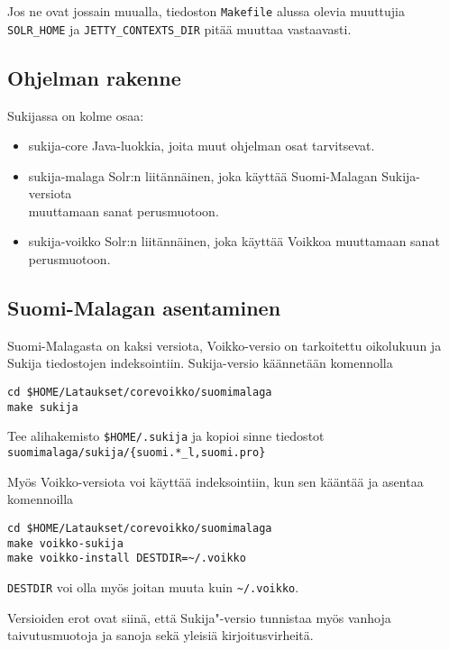 \documentclass[12pt,a4paper]{scrartcl}
\begin{document}
Jos ne ovat jossain muualla, tiedoston \verb=Makefile= alussa olevia
muuttujia \verb=SOLR_HOME= ja \verb=JETTY_CONTEXTS_DIR= pitää muuttaa
vastaavasti.

\newpage
\subsection*{Ohjelman rakenne}

Sukijassa on kolme osaa:

\begin{itemize}
\item sukija-core     Java-luokkia, joita muut ohjelman osat tarvitsevat.
\item sukija-malaga   Solr:n liitännäinen, joka käyttää Suomi-Malagan
                      Sukija-versiota \\muuttamaan sanat perusmuotoon.
\item sukija-voikko   Solr:n liitännäinen, joka käyttää Voikkoa
                      muuttamaan sanat perusmuotoon.
\end{itemize}


\subsection*{Suomi-Malagan asentaminen}

Suomi-Malagasta on kaksi versiota, Voikko-versio on tarkoitettu
oikolukuun ja Sukija tiedostojen indeksointiin. Sukija-versio
käännetään komennolla

\begin{verbatim}
cd $HOME/Lataukset/corevoikko/suomimalaga
make sukija
\end{verbatim}

Tee alihakemisto \verb=$HOME/.sukija= ja kopioi sinne tiedostot \\
\verb=suomimalaga/sukija/{suomi.*_l,suomi.pro}=

Myös Voikko-versiota voi käyttää indeksointiin, kun sen kääntää ja
asentaa komennoilla

\begin{verbatim}
cd $HOME/Lataukset/corevoikko/suomimalaga
make voikko-sukija
make voikko-install DESTDIR=~/.voikko
\end{verbatim}

\verb|DESTDIR| voi olla myös joitan muuta kuin \verb|~/.voikko|.

Versioiden erot ovat siinä, että Sukija"-versio tunnistaa myös vanhoja
taivutusmuotoja ja sanoja sekä yleisiä kirjoitusvirheitä.
\end{document}

